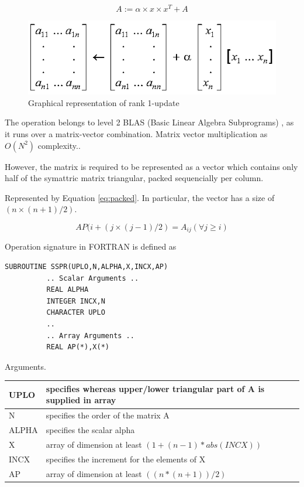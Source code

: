 \documentclass{llncs}
\begin{document}
\begin{equation}
    A := \alpha \times x \times x ^{T} + A
\label{eq:math}
\end{equation}

\begin{figure}
\begin{center}
\includegraphics[scale=0.7]{math.png}
\caption{Graphical representation of rank 1-update}
\label{fig:math}
\end{center}
\end{figure}

The operation belongs to level 2 BLAS (Basic Linear Algebra Subprograms) \cite{blas} \cite{blas-updated},
as it runs over a matrix-vector combination. Matrix vector multiplication as $ O(N^{2}) $ complexity.\cite{matmul}.

However, the matrix is required to be represented as a vector
which contains only half of the symattric matrix triangular, packed sequencially per column.

Represented by Equation \ref{eq:packed}. In particular, the vector has a size of $ (n \times (n + 1) / 2) $.

\begin{equation}
AP(i + ( j \times (j-1) / 2) = A _{ij} (\forall j \geq i)
\label{eq:packed}
\end{equation}

Operation signature in FORTRAN is defined as

\begin{lstlisting}[caption={SSPR Fortran Signature},label={lst:signature}]
SUBROUTINE SSPR(UPLO,N,ALPHA,X,INCX,AP)
          .. Scalar Arguments ..
          REAL ALPHA
          INTEGER INCX,N
          CHARACTER UPLO
          ..
          .. Array Arguments ..
          REAL AP(*),X(*)
\end{lstlisting}

Arguments.

\begin{tabular} {|l|l|} \hline
UPLO & specifies whereas upper/lower triangular part of A is supplied in array \\ \hline
N & specifies the order of the matrix A \\ \hline
ALPHA & specifies the scalar alpha \\ \hline
X & array of dimension at least $ ( 1 + ( n - 1 ) * abs( INCX ) ) $ \\ \hline
INCX & specifies the increment for the elements of X \\ \hline
AP & array of dimension at least $ ( ( n*( n + 1 ) ) / 2 ) $ \\ \hline
\end{tabular}
\end{document}
